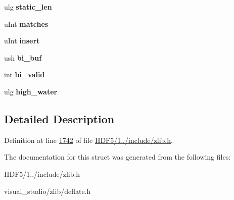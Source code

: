 \begin{DoxyCompactItemize}
\mbox{\label{structinternal__state_a8a83e269866761afa3a7b4641ba5ff91}} 
ulg {\bfseries static\+\_\+len}
\item 
\mbox{\label{structinternal__state_ac0f10ec7237615f6b632f2f4d14872ef}} 
u\+Int {\bfseries matches}
\item 
\mbox{\label{structinternal__state_a315b7281f725e5729fbbafada48fc70a}} 
u\+Int {\bfseries insert}
\item 
\mbox{\label{structinternal__state_a6880946d081053778f5f544b04603d13}} 
ush {\bfseries bi\+\_\+buf}
\item 
\mbox{\label{structinternal__state_a241f3606e41a3aa0ef22868a41bd9a0f}} 
int {\bfseries bi\+\_\+valid}
\item 
\mbox{\label{structinternal__state_a85439cd585435b2590039339139d25cb}} 
ulg {\bfseries high\+\_\+water}
\end{DoxyCompactItemize}


\subsection{Detailed Description}


Definition at line \hyperlink{_h_d_f5_21_810_81_2include_2zlib_8h_source_l01742}{1742} of file \hyperlink{_h_d_f5_21_810_81_2include_2zlib_8h_source}{H\+D\+F5/1../include/zlib.\+h}.



The documentation for this struct was generated from the following files\+:\begin{DoxyCompactItemize}
\item 
H\+D\+F5/1../include/zlib.\+h\item 
visual\+\_\+studio/zlib/deflate.\+h\end{DoxyCompactItemize}
